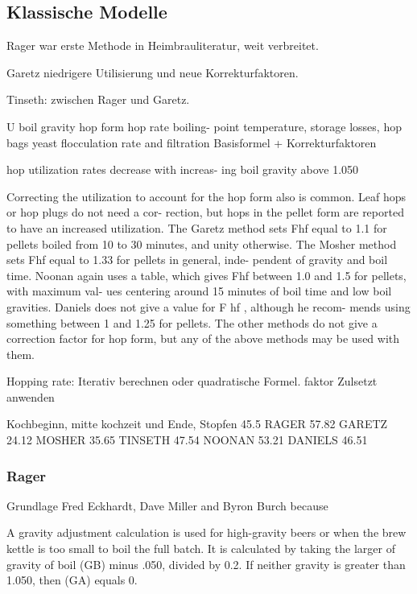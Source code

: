 \documentclass[a4paper,parskip=half]{scrartcl}
\begin{document}
\subsection*{Klassische Modelle}

\parencite[59]{Hall1997}
Rager war erste Methode in Heimbrauliteratur, weit verbreitet.

\parencite[60]{Hall1997}
Garetz niedrigere Utilisierung und neue Korrekturfaktoren.

Tinseth: zwischen Rager und Garetz.

\parencite[60]{Hall1997}
U%
boil gravity
hop form
hop rate
boiling-
point temperature, storage losses, hop bags
yeast flocculation rate and filtration
Basisformel + Korrekturfaktoren

\parencite[62]{Hall1997}
hop utilization rates decrease with increas-
ing boil gravity above 1.050

Correcting the utilization to
account for the hop form also is common.
Leaf hops or hop plugs do not need a cor-
rection, but hops in the pellet form are
reported to have an increased utilization.
The Garetz method sets Fhf equal to 1.1 for
pellets boiled from 10 to 30 minutes, and
unity otherwise. The Mosher method sets
Fhf equal to 1.33 for pellets in general, inde-
pendent of gravity and boil time. Noonan
again uses a table, which gives Fhf between
1.0 and 1.5 for pellets, with maximum val-
ues centering around 15 minutes of boil
time and low boil gravities. Daniels does not
give a value for F hf , although he recom-
mends using something between 1 and 1.25
for pellets. The other methods do not give
a correction factor for hop form, but any of
the above methods may be used with them.

\parencite[63]{Hall1997}
Hopping rate:
Iterativ berechnen oder quadratische
Formel. 
faktor Zulsetzt anwenden

\parencite[65]{Hall1997}
Kochbeginn, mitte kochzeit und Ende, Stopfen
45.5
RAGER  57.82
GARETZ 24.12
MOSHER 35.65
TINSETH  47.54
NOONAN 53.21
DANIELS 46.51

\subsubsection*{Rager}

\parencite[53]{Rager1990}
Grundlage Fred Eckhardt,
Dave Miller and Byron Burch because

A gravity adjustment calculation
is used for high-gravity beers or when
the brew kettle is too small to boil the
full batch. It is calculated by taking
the larger of gravity of boil (GB) minus
.050, divided by 0.2. If neither gravity
is greater than 1.050, then (GA)
equals 0.
\end{document}
